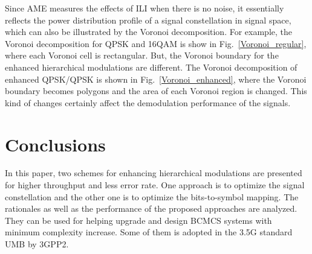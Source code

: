 \documentclass[10pt,fleqn, twocolumn]{IEEEtran}
\begin{document}
Since AME measures the effects of ILI when there is no noise, it
essentially reflects the power distribution profile of a signal
constellation in signal space, which can also be illustrated by
the Voronoi decomposition. For example, the Voronoi decomposition
for QPSK and 16QAM is show in Fig.~\ref{Voronoi_regular}, where
each Voronoi cell is rectangular. But, the Voronoi boundary for
the enhanced hierarchical modulations are different. The Voronoi
decomposition of enhanced QPSK/QPSK is shown in
Fig.~\ref{Voronoi_enhanced}, where the Voronoi boundary becomes
polygons and the area of each Voronoi region is changed. This kind
of changes certainly affect the demodulation performance of the
signals.
\begin{figure} 
\end{figure}
\begin{figure} 
\end{figure}

\section{Conclusions}
In this paper, two schemes for enhancing hierarchical modulations
are presented for higher throughput and less error rate. One
approach is to optimize the signal constellation and the other one
is to optimize the bits-to-symbol mapping. The rationales as well
as the performance of the proposed approaches are analyzed. They
can be used for helping upgrade and design BCMCS systems with
minimum complexity increase. Some of them is adopted in the 3.5G
standard UMB by 3GPP2. \small


\end{document}
